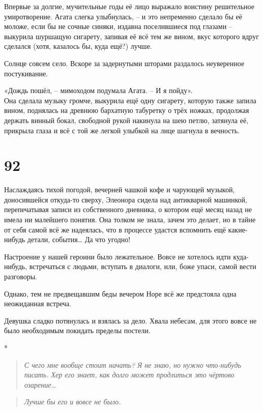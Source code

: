 \documentclass[
  a5paperpaper,
  DIV=11,
  numbers=noendperiod]{scrreprt}
\begin{document}
Впервые за долгие, мучительные годы её лицо выражало воистину
решительное умиротворение. Агата слегка улыбнулась, -- и это непременно
сделало бы её моложе, если бы не сочные синяки, издавна поселившиеся под
глазами -- выкурила шуршащую сигарету, запивая её всё тем же вином, вкус
которого вдруг сделался (хотя, казалось бы, куда ещё?) лучше.

Солнце совсем село. Вскоре за задернутыми шторами раздалось неуверенное
постукивание.

«Дождь пошёл, -- мимоходом подумала Агата. -- И я пойду».\\
Она сделала музыку громче, выкурила ещё одну сигарету, которую также
запила вином, поднялась на древнюю бархатную табуретку о трёх ножках,
продолжая держать винный бокал, свободной рукой накинула на шею петлю,
затянула её, прикрыла глаза и всё с той же легкой улыбкой на лице
шагнула в вечность.

\section*{92}\label{92}


Наслаждаясь тихой погодой, вечерней чашкой кофе и чарующей музыкой,
доносившейся откуда-то сверху, Элеонора сидела над антикварной машинкой,
перепечатывая записи из собственного дневника, о котором ещё месяц назад
не имела ни малейшего понятия. Она толком не знала, зачем это делает, но
в тайне от себя самой всё же надеялась, что в процессе удастся вспомнить
ещё какие-нибудь детали, события\ldots{} Да что угодно!

Настроение у нашей героини было лежательное. Вовсе не хотелось идти
куда-нибудь, встречаться с людьми, вступать в диалоги, или, боже упаси,
самой вести разговоры.

Однако, тем не предвещавшим беды вечером Норе всё же предстояла одна
неожиданная встреча.

Девушка сладко потянулась и взялась за дело. Хвала небесам, для этого
вовсе не было необходимым покидать пределы постели.

*

\begin{quote}
\emph{С чего мне вообще стоит начать? Я не знаю, но нужно что-нибудь
писать. Хер его знает, как долго может продлиться это чёртово
озарение\ldots{} }
\end{quote}

\begin{quote}
\emph{Лучше бы его и вовсе не было. }
\end{quote}
\end{document}

